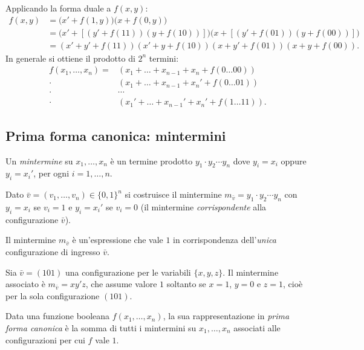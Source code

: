 \documentclass[11pt,a4paper]{article}
\begin{document}
\begin{esempio}
Applicando la forma duale a $f(x,y)$:
\begin{align*}
f(x,y) &= \bigl(x' + f(1,y)\bigr)\bigl(x + f(0,y)\bigr)\\
       &= \bigl(x' + [(y' + f(11))(y + f(10))]\bigr)
          \bigl(x + [(y' + f(01))(y + f(00))]\bigr)\\
       &= (x' + y' + f(11))(x' + y + f(10))(x + y' + f(01))(x + y + f(00)).
\end{align*}
In generale si ottiene il prodotto di $2^n$ termini:
\begin{align*}
f(x_1,\dots,x_n) = {}& (x_1 + \dots + x_{n-1} + x_n + f(0\dots00))\\
 \cdot {}& (x_1 + \dots + x_{n-1} + x_n' + f(0\dots01))\\
 \cdot {}& \cdots\\
 \cdot {}& (x_1' + \dots + x_{n-1}' + x_n' + f(1\dots11)).
\end{align*}
\end{esempio}

\subsection{Prima forma canonica: mintermini}

\begin{definizione}[Mintermine]
Un \emph{mintermine} su $x_1, \dots, x_n$ è un termine prodotto
$y_1 \cdot y_2 \cdots y_n$ dove $y_i = x_i$ oppure $y_i = x_i'$, per ogni
$i = 1, \dots, n$.

Dato $\bar{v} = (v_1, \dots, v_n) \in \{0,1\}^n$ si costruisce il mintermine
$m_{\bar{v}} = y_1 \cdot y_2 \cdots y_n$ con $y_i = x_i$ se $v_i = 1$ e
$y_i = x_i'$ se $v_i = 0$ (il mintermine \emph{corrispondente} alla
configurazione $\bar{v}$).
\end{definizione}

Il mintermine $m_{\bar{v}}$ è un'espressione che vale $1$ in corrispondenza
dell'\emph{unica} configurazione di ingresso $\bar{v}$.

\begin{esempio}
Sia $\bar{v} = (101)$ una configurazione per le variabili $\{x,y,z\}$. Il
mintermine associato è $m_{\bar{v}} = xy'z$, che assume valore $1$ soltanto se
$x = 1$, $y = 0$ e $z = 1$, cioè per la sola configurazione $(101)$.
\end{esempio}

\begin{definizione}
Data una funzione booleana $f(x_1, \dots, x_n)$, la sua rappresentazione in
\emph{prima forma canonica} è la somma di tutti i mintermini su
$x_1, \dots, x_n$ associati alle configurazioni per cui $f$ vale $1$.
\end{definizione}
\end{document}
